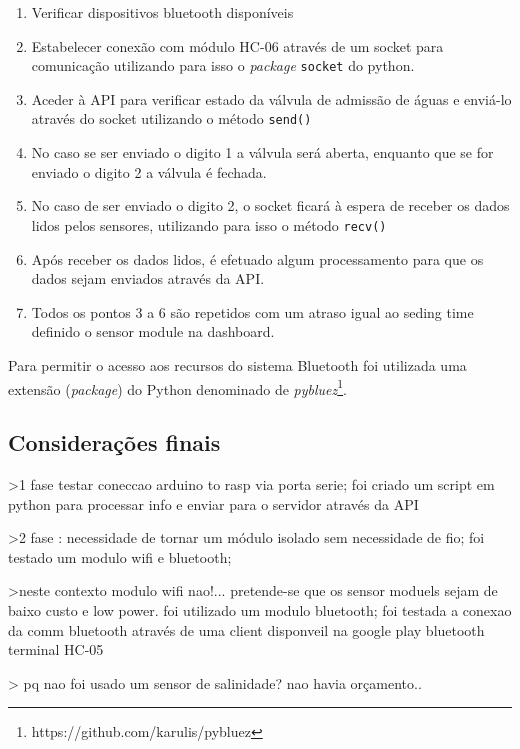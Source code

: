 \begin{enumerate}
	\item Verificar dispositivos bluetooth disponíveis
	\item Estabelecer conexão com módulo HC-06 através de um socket para comunicação utilizando para isso o \textit{package} \texttt{socket} do python. 
	\item Aceder à API para verificar estado da válvula de admissão de águas e enviá-lo através do socket utilizando o método \texttt{send()} 
	\item No caso se ser enviado o digito 1 a válvula será aberta, enquanto que se for enviado o digito 2 a válvula é fechada. 
	\item No caso de ser enviado o digito 2, o socket ficará à espera de receber os dados lidos pelos sensores, utilizando para isso o método \texttt{recv()}
	\item Após receber os dados lidos, é efetuado algum processamento para que os dados sejam enviados através da API. 
	\item Todos os pontos 3 a 6 são repetidos com um atraso igual ao seding time definido o sensor module na dashboard. 
	
\end{enumerate}

Para permitir o acesso aos recursos do sistema Bluetooth foi utilizada uma extensão (\textit{package}) do Python denominado de \textit{pybluez}\footnote{https://github.com/karulis/pybluez}. 




\subsection{Considerações finais}


>1 fase testar coneccao arduino to rasp via porta serie; foi criado um script em python para processar info e enviar para o servidor através da API 

>2 fase : necessidade de tornar um módulo isolado sem necessidade de fio; foi testado um modulo wifi e bluetooth; 

>neste contexto modulo wifi nao!... pretende-se que os sensor moduels sejam de baixo custo e low power. foi utilizado um modulo bluetooth; foi testada a conexao da comm bluetooth através de uma client disponveil na google play bluetooth terminal HC-05 


> 
pq nao foi usado um sensor de salinidade? nao havia orçamento.. 










